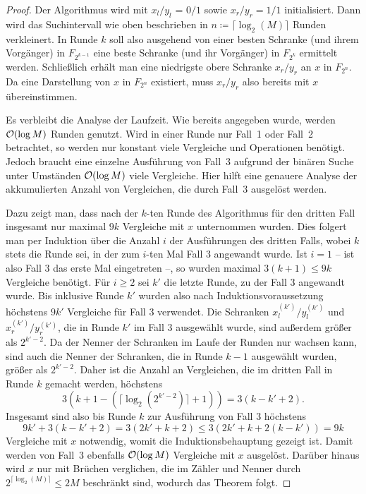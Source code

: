 \begin{proof}
 	Der Algorithmus wird mit $x_l/y_l$ = $0/1$ sowie $x_r/y_r = 1/1$ initialisiert.
 	Dann wird das Suchintervall wie oben beschrieben in $n\coloneq \lceil \log_2(M) \rceil$ Runden verkleinert.
 	In Runde $k$ soll also ausgehend von einer besten Schranke (und ihrem Vorgänger) in $F_{2^{k-1}}$ eine beste Schranke (und ihr Vorgänger) in $F_{2^{k}}$ ermittelt werden.
 	Schließlich erhält man eine niedrigste obere Schranke $x_r/y_r$ an $x$ in $F_{2^n}$.
 	Da eine Darstellung von $x$ in $F_{2^n}$ existiert, muss $x_r/y_r$ also bereits mit $x$ übereinstimmen.
 	
 	Es verbleibt die Analyse der Laufzeit.
 	Wie bereits angegeben wurde, werden $\mathcal{O}(\log M)$ Runden genutzt.
 	Wird in einer Runde nur Fall~1 oder Fall~2 betrachtet, so werden nur konstant viele Vergleiche und Operationen benötigt.
 	Jedoch braucht eine einzelne Ausführung von Fall~3 aufgrund der binären Suche unter Umständen $\mathcal{O}(\log M)$ viele Vergleiche.
 	Hier hilft eine genauere Analyse der akkumulierten Anzahl von Vergleichen, die durch Fall~3 ausgelöst werden.
 	
 	Dazu zeigt man, dass nach der $k$-ten Runde des Algorithmus für den dritten Fall insgesamt nur maximal $9k$ Vergleiche mit $x$ unternommen wurden.
 	Dies folgert man per Induktion über die Anzahl $i$ der Ausführungen des dritten Falls, wobei $k$ stets die Runde sei, in der zum $i$-ten Mal Fall $3$ angewandt wurde.
 	Ist $i=1$ -- ist also Fall 3 das erste Mal eingetreten --, so wurden maximal $3(k+1) \leq 9k$ Vergleiche benötigt.
 	Für $i\geq2$ sei $k'$ die letzte Runde, zu der Fall 3 angewandt wurde.
 	Bis inklusive Runde $k'$ wurden also nach Induktionsvoraussetzung höchstens $9k'$ Vergleiche für Fall $3$ verwendet.
 	Die Schranken $x_l^{(k')} / y_l^{(k')}$ und $x_r^{(k')} / y_r^{(k')}$, die in Runde $k'$ im Fall $3$ ausgewählt wurde, sind außerdem größer als $2^{k'-2}$.
 	Da der Nenner der Schranken im Laufe der Runden nur wachsen kann, sind auch die Nenner der Schranken, die in Runde $k-1$ ausgewählt wurden, größer als $2^{k' - 2}$.
 	Daher ist die Anzahl an Vergleichen, die im dritten Fall in Runde $k$ gemacht werden, höchstens \[
 	3(k+1-(\lceil \log_2(2^{k' - 2})\rceil + 1) )= 3(k - k' + 2).
 	\]
 	Insgesamt sind also bis Runde $k$ zur Ausführung von Fall 3 höchstens \[
 	9k' + 3(k-k'+2) = 3(2k' + k + 2) \leq 3(2k' + k + 2(k-k')) = 9 k
 	\]
 	Vergleiche mit $x$ notwendig, womit die Induktionsbehauptung gezeigt ist.
 	Damit werden von Fall~3 ebenfalls $\mathcal{O}(\log M)$ Vergleiche mit $x$ ausgelöst.
 	Darüber hinaus wird $x$ nur mit Brüchen verglichen, die im Zähler und Nenner durch $2^{\lceil \log_2(M) \rceil}\leq 2M$ beschränkt sind, wodurch das Theorem folgt.
 \end{proof}


